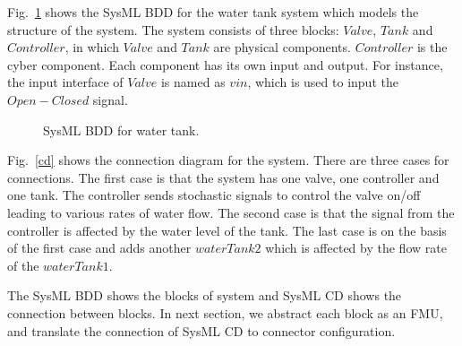 Fig.~\ref{myad} shows the SysML BDD for the water tank system which models the structure of the system. The system consists of three blocks: $Valve$, $Tank$ and $Controller$, in which $Valve$ and $Tank$ are physical components. $Controller$ is the cyber component. Each component has its own input and output. For instance, the input interface of $Valve$ is named as $vin$, which is used to input the $Open-Closed$ signal. 
\begin{figure}[htbp]
	\caption{SysML BDD for water tank.}
	\label{myad}
\end{figure}

Fig.~\ref{cd} shows the connection diagram for the system. There are three cases for connections. The first case is that the system has one valve, one controller and one tank. The controller sends stochastic signals to control the valve on/off leading to various rates of water flow. The second case is that the signal from the controller is affected by the water level of the tank. The last case is on the basis of the first case and adds another $waterTank2$ which is affected by the flow rate of the $waterTank1$.

\begin{figure}[htbp]
\end{figure}
The SysML BDD shows the blocks of system and SysML CD shows the connection between blocks. In next section, we abstract each block as an FMU, and translate the connection of SysML CD to connector configuration.

